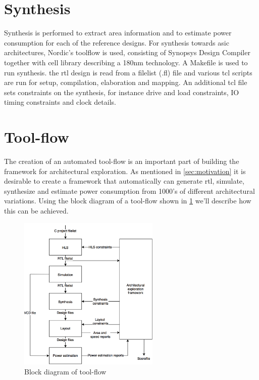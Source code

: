 \section{Synthesis}
Synthesis is performed to extract area information and to estimate power consumption for each of the reference designs. For synthesis towards \gls{asic} architectures, Nordic's toolflow is used, consisting of Synopsys Design Compiler \cite{syndescomp} together with cell library describing a 180nm technology. A Makefile is used to run synthesis. the \gls{rtl} design is read from a filelist (.fl) file and various \gls{tcl} scripts are run for setup, compilation, elaboration and mapping. An additional \gls{tcl} file sets constraints on the synthesis, for instance drive and load constraints, IO timing constraints and clock details.
\section{Tool-flow}
The creation of an automated tool-flow is an important part of building the framework for architectural exploration.  As mentioned in \cref{sec:motivation} it is desirable to create a framework that automatically can generate \gls{rtl}, simulate, synthesize and estimate power consumption from 1000's of different architectural variations. Using the block diagram of a tool-flow shown in \cref{fig:toolflowblock} we'll describe how this can be achieved. 
\begin{figure}[hbpt]
\centering
\includegraphics[width=0.6\textwidth]{../figs/Toolflow.png}
\caption{\label{fig:toolflowblock}Block diagram of tool-flow}
\end{figure}
